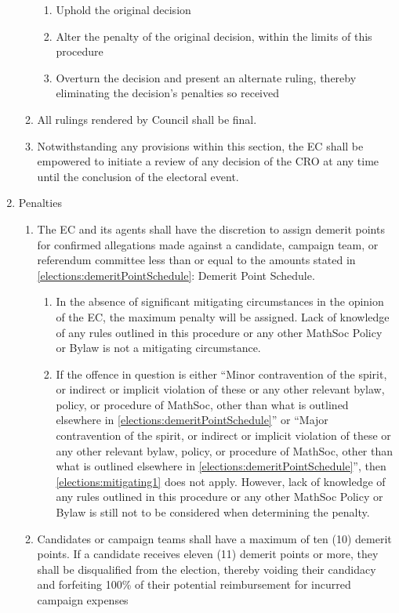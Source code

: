 \begin{enumerate}
\begin{enumerate}
				\begin{enumerate}
					\item Uphold the original decision
					\item Alter the penalty of the original decision, within the limits of this procedure
					\item Overturn the decision and present an alternate ruling, thereby eliminating the decision's penalties so received
				\end{enumerate}
			\item All rulings rendered by Council shall be final.
			\item Notwithstanding any provisions within this section, the EC shall be empowered to initiate a review of any decision of the CRO at any time until the conclusion of the electoral event.
		\end{enumerate}
	\item Penalties
		\begin{enumerate}
			\item The EC and its agents shall have the discretion to assign demerit points for confirmed allegations made against a candidate, campaign team, or referendum committee less than or equal to the amounts stated in \cref{elections:demeritPointSchedule}: Demerit Point Schedule.
				\begin{enumerate}
					\item \label{elections:mitigating1} In the absence of significant mitigating circumstances in the opinion of the EC, the maximum penalty will be assigned. Lack of knowledge of any rules outlined in this procedure or any other MathSoc Policy or Bylaw is not a mitigating circumstance.
					\item If the offence in question is either ``Minor contravention of the spirit, or indirect or implicit violation of these or any other relevant bylaw, policy, or procedure of MathSoc, other than what is outlined elsewhere in \cref{elections:demeritPointSchedule}'' or ``Major contravention of the spirit, or indirect or implicit violation of these or any other relevant bylaw, policy, or procedure of MathSoc, other than what is outlined elsewhere in \cref{elections:demeritPointSchedule}'', then \cref{elections:mitigating1} does not apply. However, lack of knowledge of any rules outlined in this procedure or any other MathSoc Policy or Bylaw is still not to be considered when determining the penalty.
				\end{enumerate}
			\item Candidates or campaign teams shall have a maximum of ten (10) demerit points. If a candidate receives eleven (11) demerit points or more, they shall be disqualified from the election, thereby voiding their candidacy and forfeiting 100\% of their potential reimbursement for incurred campaign expenses

\end{enumerate}
\end{enumerate}
